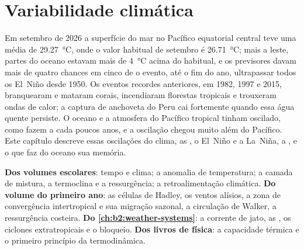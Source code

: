 \chapter{Variabilidade climática}\label{ch:b2:climate-variability}

Em setembro de 2026 a superfície do mar no Pacífico equatorial central teve uma média de \qty{29.27}{\celsius},
onde o valor habitual de setembro é \qty{26.71}{\celsius}; mais a leste, partes do oceano estavam
mais de \qty{4}{\celsius} acima do habitual, e os previsores davam mais de quatro chances em cinco
de o evento, até o fim do ano, ultrapassar todos os El~Niño desde 1950. Os eventos
recordes anteriores, em 1982, 1997 e 2015, branquearam e mataram corais, incendiaram florestas tropicais
e trouxeram ondas de calor; a captura de anchoveta do Peru cai fortemente quando essa água quente persiste. O
oceano e a atmosfera do Pacífico tropical tinham oscilado, como fazem a cada poucos anos, e a
oscilação chegou muito além do Pacífico. Este
capítulo descreve essas oscilações do clima, as , o El~Niño e a La~Niña, a , e o que faz do oceano sua memória.

\begin{recall}
\textbf{Dos volumes escolares}: tempo e clima; a anomalia de temperatura; a camada de mistura,
a termoclina e a ressurgência; a retroalimentação climática. \textbf{Do volume do primeiro ano}: as células
de Hadley, os ventos alísios, a zona de convergência intertropical e sua migração sazonal, a circulação
de Walker, a ressurgência costeira. \textbf{Do \cref{ch:b2:weather-systems}}: a corrente de jato,
as , os ciclones extratropicais e o bloqueio. \textbf{Dos livros de física}: a capacidade térmica
e o primeiro princípio da termodinâmica.
\end{recall}

